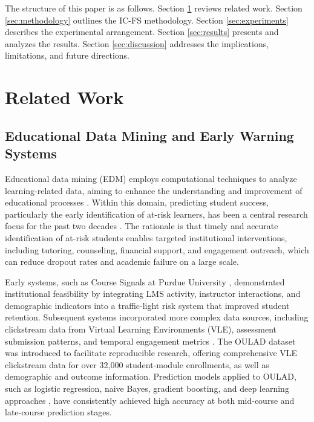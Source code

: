 \documentclass[a4paper,fleqn]{cas-sc}
\begin{document}
The structure of this paper is as follows. Section \ref{sec:related_work} reviews related work. Section \ref{sec:methodology} outlines the IC-FS methodology. Section \ref{sec:experiments} describes the experimental arrangement. Section \ref{sec:results} presents and analyzes the results. Section \ref{sec:discussion} addresses the implications, limitations, and future directions.

\section{Related Work}
\label{sec:related_work}

\subsection{Educational Data Mining and Early Warning Systems}
Educational data mining (EDM) employs computational techniques to analyze learning-related data, aiming to enhance the understanding and improvement of educational processes \cite{romero2020, baker2014}. Within this domain, predicting student success, particularly the early identification of at-risk learners, has been a central research focus for the past two decades \cite{kotsiantis2004, romero2010}. The rationale is that timely and accurate identification of at-risk students enables targeted institutional interventions, including tutoring, counseling, financial support, and engagement outreach, which can reduce dropout rates and academic failure on a large scale.

Early systems, such as Course Signals at Purdue University \cite{arnold2012}, demonstrated institutional feasibility by integrating LMS activity, instructor interactions, and demographic indicators into a traffic-light risk system that improved student retention. Subsequent systems incorporated more complex data sources, including clickstream data from Virtual Learning Environments (VLE), assessment submission patterns, and temporal engagement metrics \cite{hlosta2017, wolff2013}. The OULAD dataset \cite{kuzilek2017} was introduced to facilitate reproducible research, offering comprehensive VLE clickstream data for over 32,000 student-module enrollments, as well as demographic and outcome information. Prediction models applied to OULAD, such as logistic regression, naive Bayes, gradient boosting, and deep learning approaches \cite{waheed2020}, have consistently achieved high accuracy at both mid-course and late-course prediction stages.
\end{document}
